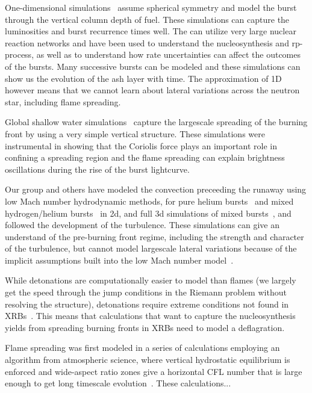 \documentclass[a4paper]{jpconf}
\newcommand{\MarginPar}[1]{\marginpar{\vskip-\baselineskip\raggedright\tiny\sffamily\hrule\smallskip{\color{red}#1}\par\smallskip\hrule}}
\begin{document}
One-dimensional simulations~\cite{woosley-xrb,fisker:2008} assume
spherical symmetry and model the burst through the vertical column
depth of fuel.  These simulations can capture the luminosities and
burst recurrence times well.  The can utilize very large nuclear
reaction networks and have been used to understand the nucleosynthesis
and rp-process, as well as to understand how rate uncertainties can
affect the outcomes of the bursts.  Many successive bursts can be
modeled and these simulations can show us the evolution of the ash
layer with time.  The approximation of 1D however means that we cannot
learn about lateral variations across the neutron star, including
flame spreading.

Global shallow water simulations~\cite{SPIT_ETAL02} capture the
largescale spreading of the burning front by using a very simple
vertical structure.  These simulations were instrumental in showing
that the Coriolis force plays an important role in confining a
spreading region and the flame spreading can explain brightness
oscillations during the rise of the burst lightcurve.

Our group and others have modeled the convection preceeding the
runaway using low Mach number hydrodynamic methods, for pure helium
bursts~\cite{Lin:2006,xrb} and mixed hydrogen/helium
bursts~\cite{xrb2} in 2d, and full 3d simulations of mixed
bursts~\cite{xrb3}, and followed the development of the turbulence.
These simulations can give an understand of the pre-burning front
regime, including the strength and character of the turbulence, but
cannot model largescale lateral variations because of the implicit
assumptions built into the low Mach number model~\cite{ABRZ:I}.

While detonations are computationally easier to model than flames (we
largely get the speed through the jump conditions in the Riemann
problem without resolving the structure), detonations require extreme
conditions not found in XRBs~\cite{ZINGALE_ETAL01,harpole:2018}.
This means that calculations that want to capture the nucleosynthesis
yields from spreading burning fronts in XRBs need to model a deflagration.

Flame spreading was first modeled in a series of calculations
employing an algorithm from atmospheric science, where vertical
hydrostatic equilibrium is enforced and wide-aspect ratio zones give a
horizontal CFL number that is large enough to get long timescale
evolution~\cite{cavecchi:2012}.  These calculations... \MarginPar{Yuri can probably best summarize}
\end{document}
